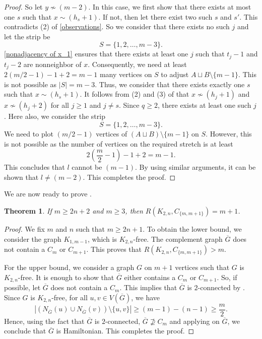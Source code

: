 \documentclass[12pt]{article}
\newtheorem{theorem}{Theorem}
\theoremstyle{definition}
\begin{document}
\begin{proof}
So let $y\nsim (m-2)$. In this case, we first show that there exists at most one $s$ such that $x\sim (h_{s}+1)$. If not, then let there exist two such $s$ and $s'$. This contradicts (2) of \eqref{observations}. So we consider that there exists no such $j$ and let the strip be
\begin{equation*}
    S=\{1,2,\ldots, m-3\}.
\end{equation*}
\eqref{nonadjacency of x_1} ensures that there exists at least one $j$ such that $t_{j}-1$ and $t_{j}-2$ are nonneighbor of $x$. Consequently, we need at least $2(m/2-1)-1+2=m-1$ many vertices on $S$ to adjust $A\sqcup B\setminus \{m-1\}$. This is not possible as $|S|=m-3$. Thus, we consider that there exists exactly one $s$ such that $x\sim (h_{s}+1)$. It follows from (2) and (3) of  that $x\nsim (h_{j}+1)$ and $x\nsim (h_{j}+2)$ for all $j\geq 1$ and $j\neq s$. Since $q\geq 2$, there exists at least one such $j$. Here also, we consider the strip 
\begin{equation*}
    S=\{1,2,\ldots, m-3\}.
\end{equation*}
We need to plot $(m/2-1)$ vertices of $(A\sqcup B)\setminus \{m-1\}$ on $S$. However, this is not possible as the number of vertices on the required stretch is at least
\begin{equation*}
    2\left(\frac{m}{2}-1\right)-1+2=m-1.
\end{equation*}
This concludes that $l$ cannot be $(m-1)$. By using similar arguments, it can be shown that $l\neq (m-2)$. This completes the proof.
\end{proof}
We are now ready to prove .
\begin{theorem}
    If $m\geq 2n+2$ and $m\geq 3$, then $R(K_{2,n},C_{\{m,m+1\}})=m+1$.
\end{theorem}
\begin{proof}
We fix $m$ and $n$ such that $m\geq 2n+1$. To obtain the lower bound, we consider the graph $K_{1,m-1}$, which is $K_{2,n}$-free. The complement graph $\overline{G}$ does not contain a $C_{m}$ or $C_{m+1}$. This proves that $R(K_{2,n},C_{\{m,m+1\}})>m$. 

    For the upper bound, we consider a graph $G$ on $m+1$ vertices such that $G$ is $K_{2,n}$-free. It is enough to show that $\overline{G}$ either contains a $C_{m}$ or $C_{m+1}$. So, if possible, let $\overline{G}$ does not contain a $C_{m}$. This implies that $\overline{G}$ is $2$-connected by . Since $G$ is $K_{2,n}$-free, for all $u,v\in V(\overline{G})$, we have
    \begin{equation*}
        |(N_{\overline{G}}(u)\cup N_{\overline{G}}(v))\setminus\{u,v\}|\geq (m-1)-(n-1)\geq \frac{m}{2}.
    \end{equation*}
     Hence, using the fact that $\overline{G}$ is $2$-connected, $ \overline{G}\nsupseteq C_{m}$ and applying  on $\overline{G}$, we conclude that $\overline{G}$ is Hamiltonian. This completes the proof.
\end{proof}
\end{document}
